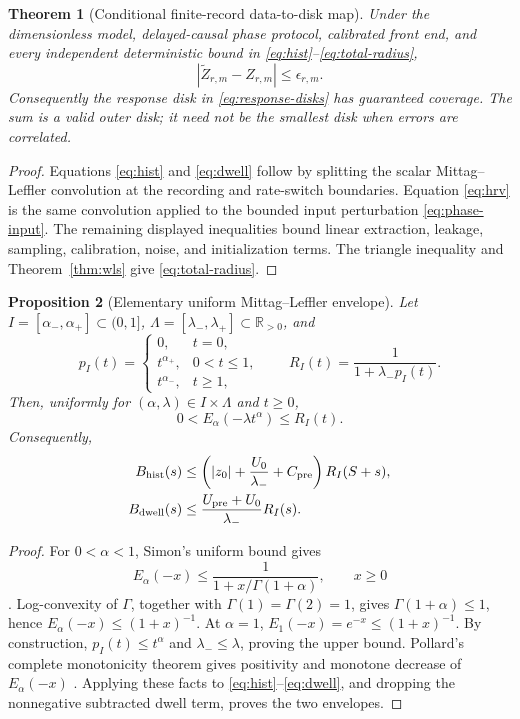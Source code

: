 \documentclass[11pt]{article}
\newtheorem{theorem}{Theorem}
\newtheorem{proposition}[theorem]{Proposition}
\theoremstyle{definition}
\theoremstyle{remark}
\begin{document}
\begin{theorem}[Conditional finite-record data-to-disk map]
Under the dimensionless model, delayed-causal phase protocol, calibrated
front end, and every independent deterministic bound in
\eqref{eq:hist}--\eqref{eq:total-radius},
\[
 |\widetilde Z_{r,m}-Z_{r,m}|\le\epsilon_{r,m}.
\]
Consequently the response disk in \eqref{eq:response-disks} has guaranteed
coverage.  The sum is a valid outer disk; it need not be the smallest disk
when errors are correlated.
\end{theorem}
\begin{proof}
Equations \eqref{eq:hist} and \eqref{eq:dwell} follow by splitting the scalar
Mittag--Leffler convolution at the recording and rate-switch boundaries.
Equation \eqref{eq:hrv} is the same convolution applied to the bounded input
perturbation \eqref{eq:phase-input}.  The remaining displayed inequalities
bound linear extraction, leakage, sampling, calibration, noise, and
initialization terms.  The triangle inequality and Theorem~\ref{thm:wls}
give \eqref{eq:total-radius}.
\end{proof}

\begin{proposition}[Elementary uniform Mittag--Leffler envelope]
\label{prop:ml-envelope}
Let \(I=[\alpha_-,\alpha_+]\subset(0,1]\),
\(\Lambda=[\lambda_-,\lambda_+]\subset\mathbb R_{>0}\), and
\[
 p_I(t)=
 \begin{cases}
 0,&t=0,\\
 t^{\alpha_+},&0<t\le1,\\
 t^{\alpha_-},&t\ge1,
 \end{cases}
 \qquad
 R_I(t)=\frac{1}{1+\lambda_-p_I(t)}.
\]
Then, uniformly for \((\alpha,\lambda)\in I\times\Lambda\) and \(t\ge0\),
\begin{equation}
 0<E_\alpha(-\lambda t^\alpha)\le R_I(t).
 \label{eq:ml-rational-envelope}
\end{equation}
Consequently,
\begin{align}
 B_{\rm hist}(s)
 &\le
 \left(|z_0|+\frac{U_0}{\lambda_-}+C_{\rm pre}\right)R_I(S+s),
 \label{eq:cert-hist-envelope}\\
 B_{\rm dwell}(s)
 &\le
 \frac{U_{\rm pre}+U_0}{\lambda_-}R_I(s).
 \label{eq:cert-dwell-envelope}
\end{align}
\end{proposition}
\begin{proof}
For \(0<\alpha<1\), Simon's uniform bound gives
\[
 E_\alpha(-x)\le
 \frac{1}{1+x/\Gamma(1+\alpha)},\qquad x\ge0
 \]
\cite{simon2014}.  Log-convexity of \(\Gamma\), together with
\(\Gamma(1)=\Gamma(2)=1\), gives \(\Gamma(1+\alpha)\le1\), hence
\(E_\alpha(-x)\le(1+x)^{-1}\).  At \(\alpha=1\),
\(E_1(-x)=e^{-x}\le(1+x)^{-1}\).  By construction,
\(p_I(t)\le t^\alpha\) and \(\lambda_-\le\lambda\), proving the upper
bound.  Pollard's complete monotonicity theorem gives positivity and
monotone decrease of \(E_\alpha(-x)\) \cite{pollard1948}.  Applying these
facts to \eqref{eq:hist}--\eqref{eq:dwell}, and dropping the nonnegative
subtracted dwell term, proves the two envelopes.
\end{proof}
\end{document}
